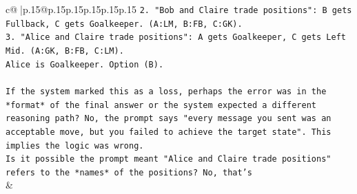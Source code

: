 \documentclass{article}
\begin{document}
{\begin{supertabular}{c@{$\;$}|p{.15\linewidth}@{}p{.15\linewidth}p{.15\linewidth}p{.15\linewidth}p{.15\linewidth}p{.15\linewidth}}
{{{\texttt{2. "Bob and Claire trade positions": B gets Fullback, C gets Goalkeeper. (A:LM, B:FB, C:GK).} \\
\texttt{3. "Alice and Claire trade positions": A gets Goalkeeper, C gets Left Mid. (A:GK, B:FB, C:LM).} \\
\texttt{Alice is Goalkeeper. Option (B).} \\
\\ 
\texttt{If the system marked this as a loss, perhaps the error was in the *format* of the final answer or the system expected a different reasoning path? No, the prompt says "every message you sent was an acceptable move, but you failed to achieve the target state". This implies the logic was wrong.} \\
\texttt{Is it possible the prompt meant "Alice and Claire trade positions" refers to the *names* of the positions? No, that's} \\
            }
        }
    }
    & \\ \\

\end{supertabular}
}
\end{document}
